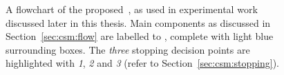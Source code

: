\begin{figure}[t!]
    \centering
    \caption[Flowchart of the~]{A flowchart of the proposed~, as used in experimental work discussed later in this thesis. Main components as discussed in Section~\ref{sec:csm:flow} are labelled  to , complete with light blue surrounding boxes. The \emph{three} stopping decision points are highlighted with \emph{1}, \emph{2} and \emph{3} (refer to Section~\ref{sec:csm:stopping}).}
    \label{fig:csm}
\end{figure}

